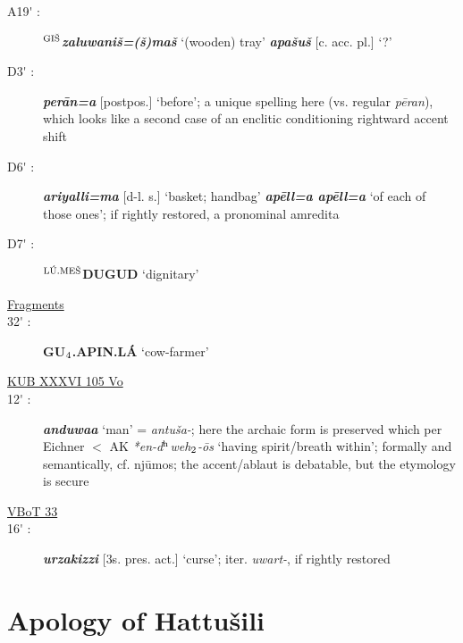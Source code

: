 \documentclass[10pt]{article}
\newcommand{\supersc}[1]{$^{\textrm{\scriptsize{#1}}}$}  	%
\newcommand{\subsc}[1]{$_{\textrm{\scriptsize{#1}}}$}	%
\newcommand{\bit}[1]{\textbf{\textit{#1}}}				%
\newcommand{\p}[1]{{\tiny[{#1}]}}					%
\renewcommand{\dh}{d\supersc{h}}							%
\newcommand{\hii}{h\subsc{2}}								%
\newcommand{\pr}{\'{ }}									%
\newcommand{\hith}{\textsubwedge{h}}
\newcommand{\men}{\supersc{L\'U.ME\v{S}}}
\newcommand{\wood}{\supersc{GI\v{S}}}
\renewcommand{\.}[1]{\textsubdot{#1}}
\begin{document}
\begin{description}
\item[A19{\pr} :] \textbf{\wood}\bit{zaluwani\v{s}=(\v{s})ma\v{s}} `(wooden) tray' \bit{{\hith}apa\v{s}u\v{s}} \p{c. acc. pl.} `?'

\item[D3{\pr} :] \bit{per\=an=a} \p{postpos.} `before'; a unique spelling here (vs. regular \textit{p\=eran}), which looks like a second case of an enclitic conditioning rightward accent shift 

\item[D6{\pr} :] \bit{ariyalli=ma} \p{d-l. s.} `basket; handbag' \bit{ap\=ell=a ap\=ell=a} `of each of those ones'; if rightly restored, a pronominal amredita 

\item[D7{\pr} :] \textbf{{\men}DUGUD} `dignitary'

\smallskip
\item[\underline{Fragments}]
\smallskip

\item[32{\pr} :] \textbf{GU\subsc{4}.APIN.L\'A} `cow-farmer'

\smallskip
\item[\underline{KUB XXXVI 105 Vo}]
\smallskip

\item[12{\pr} :] \bit{anduwa{\hith\hith}a} `man'	= \textit{antu{\hith}\v{s}a-}; here the archaic form is preserved which  per Eichner $<$ AK \textit{*en-{\dh}we{\hii}-\=os} `having spirit/breath within'; formally and semantically, cf. {\greektext {}nj\=umos}; the accent/ablaut is debatable, but the etymology is secure

\smallskip
\item[\underline{VBoT 33}]
\smallskip

\item[16{\pr} :] \bit{{\hith}urzakizzi} \p{3s. pres. act.} `curse'; iter. \textit{{\hith}uwart-}, if rightly restored

\end{description}

\section{Apology of Hattu\v{s}ili}
\end{document}
